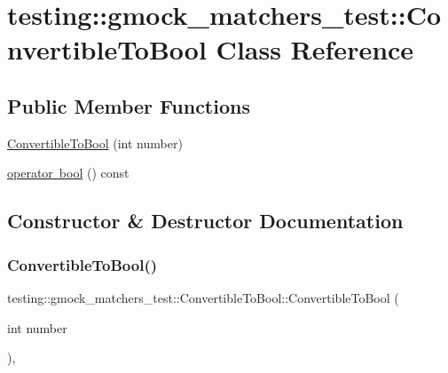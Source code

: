 \hypertarget{classtesting_1_1gmock__matchers__test_1_1ConvertibleToBool}{}\section{testing\+::gmock\+\_\+matchers\+\_\+test\+::Convertible\+To\+Bool Class Reference}
\label{classtesting_1_1gmock__matchers__test_1_1ConvertibleToBool}
\subsection*{Public Member Functions}
\begin{DoxyCompactItemize}
\item 
\mbox{\hyperlink{classtesting_1_1gmock__matchers__test_1_1ConvertibleToBool_a4e01a99e144a393bc11a40fb43e8a6f1}{Convertible\+To\+Bool}} (int number)
\item 
\mbox{\hyperlink{classtesting_1_1gmock__matchers__test_1_1ConvertibleToBool_a4ad9766b9d5179a1207af2449405f071}{operator bool}} () const
\end{DoxyCompactItemize}


\subsection{Constructor \& Destructor Documentation}
\mbox{\label{classtesting_1_1gmock__matchers__test_1_1ConvertibleToBool_a4e01a99e144a393bc11a40fb43e8a6f1}} 
\subsubsection{\texorpdfstring{ConvertibleToBool()}{ConvertibleToBool()}}
{\footnotesize\ttfamily testing\+::gmock\+\_\+matchers\+\_\+test\+::\+Convertible\+To\+Bool\+::\+Convertible\+To\+Bool (\begin{DoxyParamCaption}\item[{int}]{number }\end{DoxyParamCaption})\hspace{0.3cm}{\ttfamily [inline]}, {\ttfamily [explicit]}}



